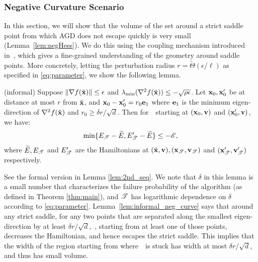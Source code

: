 \subsubsection{Negative Curvature Scenario}
In this section, we will show that the volume of the set around a strict saddle point from which AGD does not escape quickly is very small (Lemma~\ref{lem:negHess}).
We do this using the coupling mechanism introduced in~\cite{jin2017escape}, which gives a fine-grained understanding of the geometry around saddle points.
More concretely, letting the perturbation radius $r = \tilde{\Theta}(\epsilon/\ell)$ as specified in \eqref{eq:parameter}, we show the following lemma.
\begin{lemma} (informal) \label{lem:informal_neg_curve}
Suppose $\left\|{\nabla f(\tilde{\mathbf{x}})}\right\| \le \epsilon$ and $\lambda_{\min}(\nabla^2 f(\tilde{\mathbf{x}})) \le - \sqrt{\rho\epsilon}$. Let $\mathbf{x}_0,  \mathbf{x} '_0$ be at distance at most $r$ from $\tilde{\mathbf{x}}$, and $\mathbf{x}_0 -  \mathbf{x} '_0 = r_0 \mathbf{e}_1$ where $\mathbf{e}_1$ is the minimum eigen-direction of $\nabla^2 f(\tilde{\mathbf{x}})$ and $r_0 \ge \delta r /\sqrt{d}$. Then for~\nag~starting at $(\mathbf{x}_0, \mathbf{v})$ and $(\mathbf{x}_0', \mathbf{v})$, we have:
\begin{align*}
\min\{E_{\mathscr{T}} - \widetilde{E}, E '_{\mathscr{T}} - \widetilde{E}\} \le - \mathscr{E},
\end{align*}
where $\widetilde{E},E_{\mathscr{T}}$ and $E '_{\mathscr{T}}$ are the Hamiltonians at $(\tilde{\mathbf{x}}, \mathbf{v}), (\mathbf{x}_{\mathscr{T}}, \mathbf{v}_{\mathscr{T}})$ and $(\mathbf{x} '_{\mathscr{T}}, \mathbf{v} '_{\mathscr{T}})$ respectively.
\end{lemma}
\noindent See the formal version in Lemma \ref{lem:2nd_seq}. We note that $\delta$ in this lemma is a small number that characterizes the failure probability of the algorithm (as defined in Theorem \ref{thm:main}), and $\mathscr{T}$ has logarithmic dependence on $\delta$ according to \eqref{eq:parameter}.
Lemma~\ref{lem:informal_neg_curve} says that around any strict saddle, for any two points that are separated along the smallest eigen-direction by at least $\delta r /\sqrt{d}$,~\pagd, starting from at least one of those points, decreases the Hamiltonian, and hence escapes the strict saddle. This implies that the width of the region starting from where~\nag~is stuck has width at most $\delta r /\sqrt{d}$, and thus has small volume.

